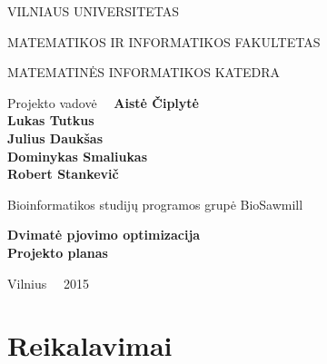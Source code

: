 \documentclass[a4paper,12pt]{article}
\begin{document}
\renewcommand{\cftdot}{.}	
\renewcommand{\cftsecleader}{\cftdotfill{\cftdotsep}}

\thispagestyle{empty} %


\begin{center}
 VILNIAUS UNIVERSITETAS 
 
MATEMATIKOS IR INFORMATIKOS FAKULTETAS

MATEMATINĖS INFORMATIKOS KATEDRA

\vspace{4cm}

Projekto vadovė \ \ \textbf{Aistė Čiplytė} \\
\textbf{Lukas Tutkus} \\
\textbf{Julius Daukšas} \\
\textbf{Dominykas Smaliukas} \\
\textbf{Robert Stankevič} \\

\vspace{0.2cm}

Bioinformatikos studijų programos grupė BioSawmill



\vspace{3cm}
\textbf{\Large Dvimatė pjovimo optimizacija}\\
\textbf{\Large Projekto planas}

\vfill

Vilnius \ \  2015
\end{center}



\clearpage

\tableofcontents
\clearpage
\section{Reikalavimai}
\end{document}
